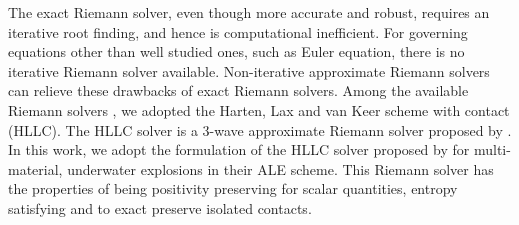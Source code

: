 \documentclass[review]{elsarticle}
\begin{document}
The exact Riemann solver, even though more accurate and robust, requires an iterative root finding, and hence is computational inefficient. For governing equations other than well studied ones, such as Euler equation, there is no iterative Riemann solver available. Non-iterative approximate Riemann solvers can relieve these drawbacks of exact Riemann solvers. Among the available Riemann solvers \citep{rider1994review, luo2004computation, puri2014approximate}, we adopted the Harten, Lax and van Keer scheme with contact (HLLC).
The HLLC solver is a 3-wave approximate Riemann solver proposed by \citet{toro1994restoration}. In this work, we adopt the formulation of the HLLC solver proposed by \citet{luo2004computation} for multi-material, underwater explosions in their ALE scheme. This Riemann solver has the properties of being positivity preserving for scalar quantities, entropy satisfying and to exact preserve isolated contacts.
\end{document}
